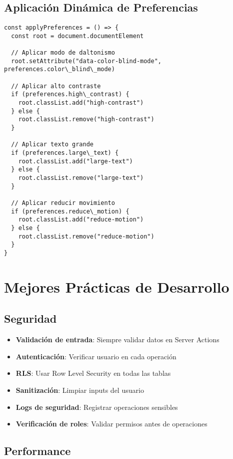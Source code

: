 \documentclass[12pt,a4paper]{article}
\begin{document}
\subsection{Aplicación Dinámica de Preferencias}

\begin{lstlisting}[caption=Aplicación de preferencias de accesibilidad]
const applyPreferences = () => {
  const root = document.documentElement

  // Aplicar modo de daltonismo
  root.setAttribute("data-color-blind-mode", preferences.color\_blind\_mode)

  // Aplicar alto contraste
  if (preferences.high\_contrast) {
    root.classList.add("high-contrast")
  } else {
    root.classList.remove("high-contrast")
  }

  // Aplicar texto grande
  if (preferences.large\_text) {
    root.classList.add("large-text")
  } else {
    root.classList.remove("large-text")
  }

  // Aplicar reducir movimiento
  if (preferences.reduce\_motion) {
    root.classList.add("reduce-motion")
  } else {
    root.classList.remove("reduce-motion")
  }
}
\end{lstlisting}

\section{Mejores Prácticas de Desarrollo}

\subsection{Seguridad}

\begin{itemize}
    \item \textbf{Validación de entrada}: Siempre validar datos en Server Actions
    \item \textbf{Autenticación}: Verificar usuario en cada operación
    \item \textbf{RLS}: Usar Row Level Security en todas las tablas
    \item \textbf{Sanitización}: Limpiar inputs del usuario
    \item \textbf{Logs de seguridad}: Registrar operaciones sensibles
    \item \textbf{Verificación de roles}: Validar permisos antes de operaciones
\end{itemize}

\subsection{Performance}
\end{document}
